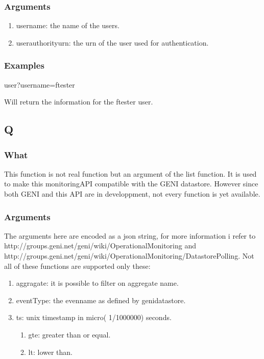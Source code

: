 \begin{otherlanguage}{english}
\subsubsection{Arguments}
\begin{enumerate}
\item username: the name of the users.
\item userauthorityurn: the urn of the user used for authentication.
\end{enumerate}
\subsubsection{Examples}
\begin{lt}
user?username=ftester
\end{lt}
Will return the information for the ftester user.
\\
\subsection{Q}
\subsubsection{What}
This function is not real function but an argument of the list function. It is used to make this monitoringAPI compatible with the GENI datastore. However since both GENI and this API are in developpment, not every function is yet available.
\subsubsection{Arguments}
The arguments here are encoded as a json string, for more information i refer to\\
http://groups.geni.net/geni/wiki/OperationalMonitoring and\\
http://groups.geni.net/geni/wiki/OperationalMonitoring/DatastorePolling.
\npar
Not all of these functions are supported only these:
\begin{enumerate}
\item aggragate: it is possible to filter on aggregate name.
\item eventType: the evenname as defined by genidatastore. 
\item ts: unix timestamp in micro( 1/1000000) seconds.
\begin{enumerate}
\item gte: greater than or equal.
\item lt: lower than.
\end{enumerate}
\end{enumerate}

\end{otherlanguage}
